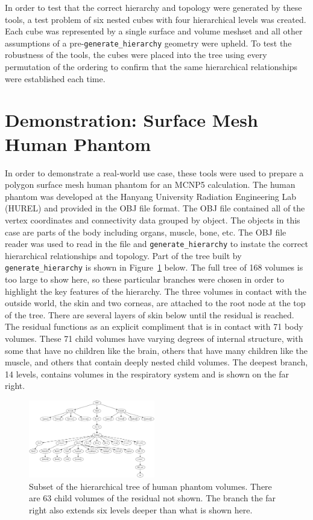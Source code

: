 \documentclass{anstrans}
\begin{document}
In order to test that the correct hierarchy and topology were generated
by these tools, a test problem of six nested cubes with four hierarchical
levels was created.  Each cube was represented by a single surface and volume meshset and
all other assumptions of a pre-\texttt{generate\_hierarchy} geometry were
upheld.  To test the robustness of the tools, the cubes were placed
into the tree using every permutation of the ordering to confirm that the same
hierarchical relationships were established each time.

\section{Demonstration: Surface Mesh Human Phantom}

In order to demonstrate a real-world use case, these tools were used to
prepare a polygon surface mesh human phantom for an MCNP5 calculation.  The
human phantom was developed at the Hanyang University Radiation Engineering Lab (HUREL) and provided in the OBJ file
format.  The OBJ file contained all of the vertex coordinates
and connectivity data grouped by object.  The objects in this case are parts
of the body including organs, muscle, bone, etc.  The OBJ file reader was used
to read in the file and \texttt{generate\_hierarchy} to instate the correct
hierarchical relationships and topology.  Part of the tree built by \texttt{generate\_hierarchy}
is shown in Figure~\ref{fig:trimtree} below.  The full tree of 168 volumes is too large to
show here, so these particular branches were chosen in order to highlight the key features of the 
hierarchy.  The three volumes in contact with the outside
world, the skin and two corneas, are attached to the root node at the top of the tree.  
There are several layers of skin below until the residual is reached. The residual
functions as an explicit compliment that is in contact with 71 body volumes.
These 71 child volumes have varying degrees of internal structure, with some that have no children like the brain,
others that have many children like the muscle, and others that contain deeply nested child volumes.  The deepest branch, 14 levels,
contains volumes in the respiratory system and is shown on the far right.

\begin{figure}[ht]
 \centering
 \includegraphics[width=0.49\textwidth]{../figs/trimtree.png}
 \caption{Subset of the hierarchical tree of human phantom volumes.  
          There are 63 child volumes of the residual not shown. 
          The branch the far right also extends
          six levels deeper than what is shown here.}
 \label{fig:trimtree}
\end{figure}
\end{document}
